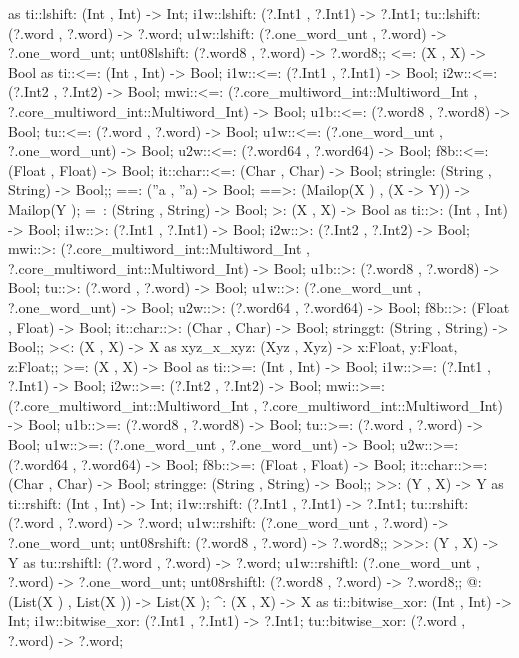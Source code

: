 as  ti::lshift: (Int , Int) -> Int;
    i1w::lshift: (?.Int1 , ?.Int1) -> ?.Int1;
    tu::lshift: (?.word , ?.word) -> ?.word;
    u1w::lshift: (?.one_word_unt , ?.word) -> ?.one_word_unt;
    unt08lshift: (?.word8 , ?.word) -> ?.word8;;
<=:
(X , X) -> Bool
as  ti::<=: (Int , Int) -> Bool;
    i1w::<=: (?.Int1 , ?.Int1) -> Bool;
    i2w::<=: (?.Int2 , ?.Int2) -> Bool;
    mwi::<=: (?.core_multiword_int::Multiword_Int , ?.core_multiword_int::Multiword_Int) -> Bool;
    u1b::<=: (?.word8 , ?.word8) -> Bool;
    tu::<=: (?.word , ?.word) -> Bool;
    u1w::<=: (?.one_word_unt , ?.one_word_unt) -> Bool;
    u2w::<=: (?.word64 , ?.word64) -> Bool;
    f8b::<=: (Float , Float) -> Bool;
    it::char::<=: (Char , Char) -> Bool;
    stringle: (String , String) -> Bool;;
==: (''a , ''a) -> Bool;
==>: (Mailop(X ) , (X -> Y)) -> Mailop(Y );
=~: (String , String) -> Bool;
>:
(X , X) -> Bool
as  ti::>: (Int , Int) -> Bool;
    i1w::>: (?.Int1 , ?.Int1) -> Bool;
    i2w::>: (?.Int2 , ?.Int2) -> Bool;
    mwi::>: (?.core_multiword_int::Multiword_Int , ?.core_multiword_int::Multiword_Int) -> Bool;
    u1b::>: (?.word8 , ?.word8) -> Bool;
    tu::>: (?.word , ?.word) -> Bool;
    u1w::>: (?.one_word_unt , ?.one_word_unt) -> Bool;
    u2w::>: (?.word64 , ?.word64) -> Bool;
    f8b::>: (Float , Float) -> Bool;
    it::char::>: (Char , Char) -> Bool;
    stringgt: (String , String) -> Bool;;
><: (X , X) -> X as xyz_x_xyz: (Xyz , Xyz) -> {x:Float, y:Float, z:Float};;
>=:
(X , X) -> Bool
as  ti::>=: (Int , Int) -> Bool;
    i1w::>=: (?.Int1 , ?.Int1) -> Bool;
    i2w::>=: (?.Int2 , ?.Int2) -> Bool;
    mwi::>=: (?.core_multiword_int::Multiword_Int , ?.core_multiword_int::Multiword_Int) -> Bool;
    u1b::>=: (?.word8 , ?.word8) -> Bool;
    tu::>=: (?.word , ?.word) -> Bool;
    u1w::>=: (?.one_word_unt , ?.one_word_unt) -> Bool;
    u2w::>=: (?.word64 , ?.word64) -> Bool;
    f8b::>=: (Float , Float) -> Bool;
    it::char::>=: (Char , Char) -> Bool;
    stringge: (String , String) -> Bool;;
>>:
(Y , X) -> Y
as  ti::rshift: (Int , Int) -> Int;
    i1w::rshift: (?.Int1 , ?.Int1) -> ?.Int1;
    tu::rshift: (?.word , ?.word) -> ?.word;
    u1w::rshift: (?.one_word_unt , ?.word) -> ?.one_word_unt;
    unt08rshift: (?.word8 , ?.word) -> ?.word8;;
>>>:
(Y , X) -> Y
as  tu::rshiftl: (?.word , ?.word) -> ?.word;
    u1w::rshiftl: (?.one_word_unt , ?.word) -> ?.one_word_unt;
    unt08rshiftl: (?.word8 , ?.word) -> ?.word8;;
@: (List(X ) , List(X )) -> List(X );
^:
(X , X) -> X
as  ti::bitwise_xor: (Int , Int) -> Int;
    i1w::bitwise_xor: (?.Int1 , ?.Int1) -> ?.Int1;
    tu::bitwise_xor: (?.word , ?.word) -> ?.word;
